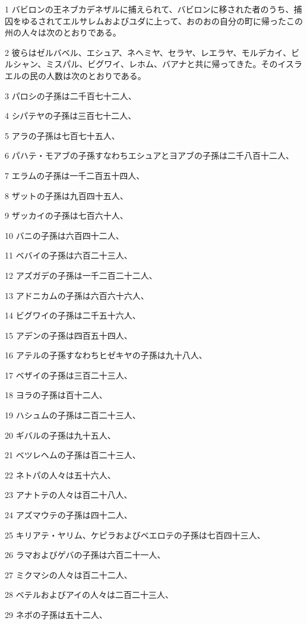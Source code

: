 \par 1 バビロンの王ネブカデネザルに捕えられて、バビロンに移された者のうち、捕囚をゆるされてエルサレムおよびユダに上って、おのおの自分の町に帰ったこの州の人々は次のとおりである。
\par 2 彼らはゼルバベル、エシュア、ネヘミヤ、セラヤ、レエラヤ、モルデカイ、ビルシャン、ミスパル、ビグワイ、レホム、バアナと共に帰ってきた。そのイスラエルの民の人数は次のとおりである。
\par 3 パロシの子孫は二千百七十二人、
\par 4 シパテヤの子孫は三百七十二人、
\par 5 アラの子孫は七百七十五人、
\par 6 パハテ・モアブの子孫すなわちエシュアとヨアブの子孫は二千八百十二人、
\par 7 エラムの子孫は一千二百五十四人、
\par 8 ザットの子孫は九百四十五人、
\par 9 ザッカイの子孫は七百六十人、
\par 10 バニの子孫は六百四十二人、
\par 11 ベバイの子孫は六百二十三人、
\par 12 アズガデの子孫は一千二百二十二人、
\par 13 アドニカムの子孫は六百六十六人、
\par 14 ビグワイの子孫は二千五十六人、
\par 15 アデンの子孫は四百五十四人、
\par 16 アテルの子孫すなわちヒゼキヤの子孫は九十八人、
\par 17 ベザイの子孫は三百二十三人、
\par 18 ヨラの子孫は百十二人、
\par 19 ハシュムの子孫は二百二十三人、
\par 20 ギバルの子孫は九十五人、
\par 21 ベツレヘムの子孫は百二十三人、
\par 22 ネトパの人々は五十六人、
\par 23 アナトテの人々は百二十八人、
\par 24 アズマウテの子孫は四十二人、
\par 25 キリアテ・ヤリム、ケピラおよびベエロテの子孫は七百四十三人、
\par 26 ラマおよびゲバの子孫は六百二十一人、
\par 27 ミクマシの人々は百二十二人、
\par 28 ベテルおよびアイの人々は二百二十三人、
\par 29 ネボの子孫は五十二人、
